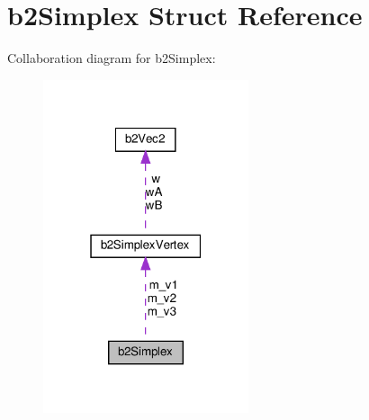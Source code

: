 \hypertarget{structb2Simplex}{}\section{b2\+Simplex Struct Reference}
\label{structb2Simplex}


Collaboration diagram for b2\+Simplex\+:
\nopagebreak
\begin{figure}[H]
\begin{center}
\leavevmode
\includegraphics[width=171pt]{structb2Simplex__coll__graph}
\end{center}
\end{figure}
